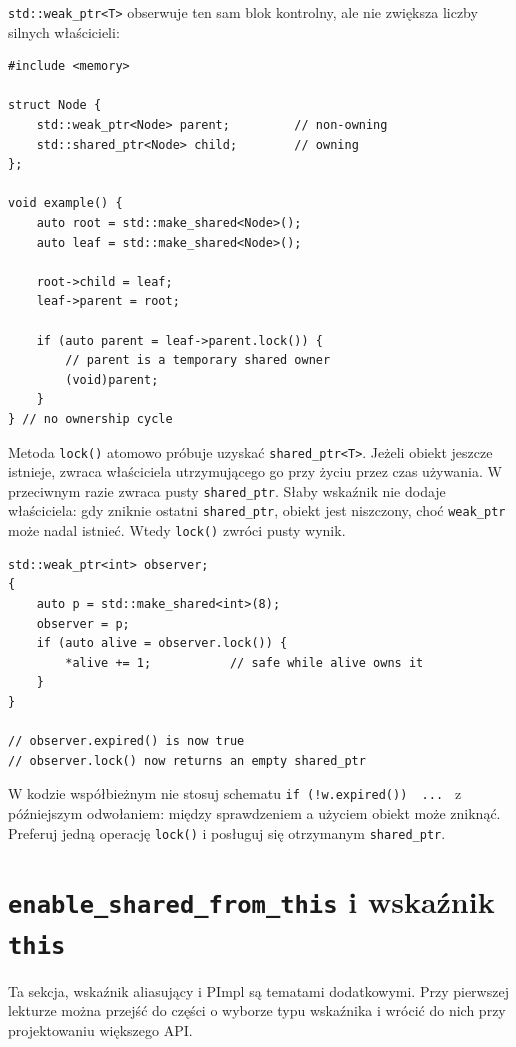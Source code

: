 \texttt{std::weak\_ptr<T>} obserwuje ten sam blok kontrolny,
ale nie zwiększa liczby silnych właścicieli:

\begin{lstlisting}
#include <memory>

struct Node {
    std::weak_ptr<Node> parent;         // non-owning
    std::shared_ptr<Node> child;        // owning
};

void example() {
    auto root = std::make_shared<Node>();
    auto leaf = std::make_shared<Node>();

    root->child = leaf;
    leaf->parent = root;

    if (auto parent = leaf->parent.lock()) {
        // parent is a temporary shared owner
        (void)parent;
    }
} // no ownership cycle
\end{lstlisting}

Metoda \texttt{lock()} atomowo próbuje uzyskać
\texttt{shared\_ptr<T>}. Jeżeli obiekt jeszcze istnieje,
zwraca właściciela utrzymującego go przy życiu przez czas
używania. W przeciwnym razie zwraca pusty \texttt{shared\_ptr}.
Słaby wskaźnik nie dodaje właściciela: gdy zniknie ostatni
\texttt{shared\_ptr}, obiekt jest niszczony, choć \texttt{weak\_ptr}
może nadal istnieć. Wtedy \texttt{lock()} zwróci pusty wynik.

\begin{lstlisting}
std::weak_ptr<int> observer;
{
    auto p = std::make_shared<int>(8);
    observer = p;
    if (auto alive = observer.lock()) {
        *alive += 1;           // safe while alive owns it
    }
}

// observer.expired() is now true
// observer.lock() now returns an empty shared_ptr
\end{lstlisting}

W kodzie współbieżnym nie stosuj schematu
\texttt{if (!w.expired()) { ... }} z późniejszym odwołaniem:
między sprawdzeniem a użyciem obiekt może zniknąć.
Preferuj jedną operację \texttt{lock()} i posługuj się
otrzymanym \texttt{shared\_ptr}.

\section{\texttt{enable\_shared\_from\_this} i wskaźnik \texttt{this}}

Ta sekcja, wskaźnik aliasujący i PImpl są tematami dodatkowymi.
Przy pierwszej lekturze można przejść do części o wyborze typu
wskaźnika i wrócić do nich przy projektowaniu większego API.

